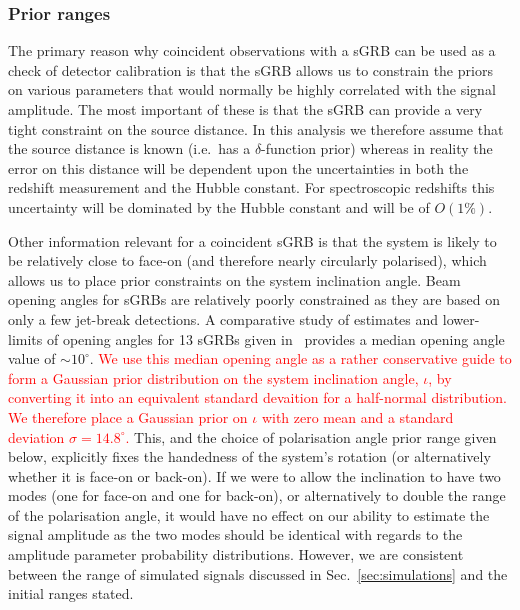 \documentclass[prd, twocolumn, lengthcheck, superscriptaddress, showpacs, letterpaper, nofootinbib]{revtex4-1}
\newcommand{\refresp}[1]{\textcolor{red}{#1}}
\begin{document}
\subsubsection{Prior ranges}\label{sec:priors}

The primary reason why coincident observations with a \ac{sGRB} can be used as
a check of detector calibration is that the \ac{sGRB} allows us to constrain
the priors on various parameters that would normally be highly correlated with
the signal amplitude. The most important of these is that the \ac{sGRB} can
provide a very tight constraint on the source distance. In this analysis we therefore
assume that the source distance is known (i.e.\ has a $\delta$-function
prior) whereas in reality the error on this distance will be dependent
upon the uncertainties in both the redshift measurement and the Hubble
constant. For spectroscopic redshifts this uncertainty will be dominated by the
Hubble constant and will be of $O(1\%)$.

Other information relevant for a coincident \ac{sGRB} is that the system is
likely to be relatively close to face-on (and therefore nearly circularly
polarised), which allows us to place prior constraints on the system
inclination angle. Beam opening angles for \acp{sGRB} are relatively poorly
constrained as they are based on only a few jet-break detections. A comparative
study of estimates and lower-limits of opening angles for 13 \acp{sGRB} given
in~\cite{2014ApJ...780..118F} provides a median opening angle value of $\sim
10^{\circ}$. \refresp{We use this median opening angle as a rather conservative
guide to form a Gaussian prior distribution on the system inclination angle,
$\iota$, by converting it into an equivalent standard devaition for a half-normal
distribution. We therefore place a Gaussian prior on $\iota$ with zero mean and a standard deviation
$\sigma=14.8^{\circ}$.} This, and the choice of polarisation angle prior range given below, 
explicitly fixes the handedness of the system's rotation (or alternatively whether it is face-on or 
back-on). If we were to allow the inclination to have two modes (one for face-on and one 
for back-on), or alternatively to double the range of the polarisation angle, it would have no 
effect on our ability to estimate the signal amplitude as the two modes should be identical with 
regards to the amplitude parameter probability distributions. However, we are consistent between the 
range of simulated signals discussed in Sec.~\ref{sec:simulations} and the initial ranges stated.
\end{document}
